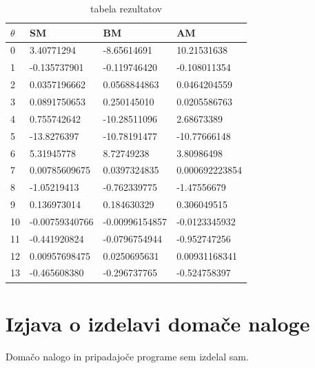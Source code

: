 \documentclass[a4paper,11pt]{article}
\begin{document}
\begin{table}[h]
\centering
\begin{tabular}{l|l|l|l}
$\theta$ & SM & BM & AM \\
\hline
0 & 3.40771294 & -8.65614691 & 10.21531638\\
1 & -0.135737901 & -0.119746420 & -0.108011354\\
2 & 0.0357196662 & 0.0568844863 & 0.0464204559\\
3 & 0.0891750653 & 0.250145010 & 0.0205586763\\
4 & 0.755742642 & -10.28511096 & 2.68673389\\
5 & -13.8276397 & -10.78191477 & -10.77666148\\
6 & 5.31945778 & 8.72749238 & 3.80986498\\
7 & 0.00785609675 & 0.0397324835 & 0.000692223854\\
8 & -1.05219413 & -0.762339775 & -1.47556679\\
9 & 0.136973014 & 0.184630329 & 0.306049515\\
10 & -0.00759340766 & -0.00996154857 & -0.0123345932\\
11 & -0.441920824 & -0.0796754944 & -0.952747256\\
12 & 0.00957698475 & 0.0250695631 & 0.00931168341\\
13 & -0.465608380 & -0.296737765 & -0.524758397\\
\end{tabular}
\caption{tabela rezultatov}
\label{t:rez}
\end{table}

\section{Izjava o izdelavi domače naloge}
Domačo nalogo in pripadajoče programe sem izdelal sam.
\end{document}
